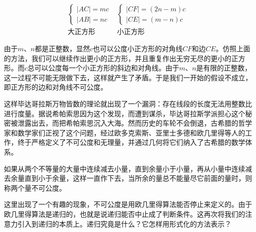 \documentclass[UTF8]{article}
\begin{document}
\[
\begin{array}{c|c}
\begin{cases}
|AC| = mc \\
|AB| = nc
\end{cases} &
\begin{cases}
|CF| = (2n - m)c \\
|CE| = (m - n)c
\end{cases} \\[4ex]
\text{大正方形} & \text{小正方形}
\end{array}
\]

由于$m$、$n$都是正整数，显然$c$也可以公度小正方形的对角线$CF$和边$CE$。仿照上面的方法，我们可以继续作出更小的正方形，并且重复作出无穷无尽的更小的正方形。而$c$总可以公度每一个小正方形的斜边和对角线。由于$m$、$n$是有限的正整数，这一过程不可能无限做下去，这样就产生了矛盾。于是我们一开始的假设不成立，即正方形的边和对角线不可公度。

这样毕达哥拉斯万物皆数的理论就出现了一个漏洞：存在线段的长度无法用整数比进行度量。据说希帕索思因为这个发现，而遭到谋杀，毕达哥拉斯学派担心这个秘密被泄露出去，而把希帕索思沉入大海。然而历史的车轮不会倒退，古希腊的哲学家和数学家们正视了这个问题，经过欧多克索斯、亚里士多德和欧几里得等人的工作，终于严格定义了不可公度和无理量，并通过几何将它们纳入了古希腊的数学体系。

\begin{proposition}
如果从两个不等量的大量中连续减去小量，直到余量小于小量，再从小量中连续减去余量直到小于余量，这样一直作下去，当所余的量总不能量尽它前面的量时，则称两个量不可公度。
\end{proposition}

这里出现了一个有趣的现象，不可公度是用欧几里得算法能否停止来定义的。由于欧几里得算法是递归的，也就是说递归能否中止成了判断条件。这再次将我们的注意力引入到递归的本质上。递归究竟是什么？它怎样用形式化的方法表示？

\begin{Exercise}
\end{Exercise}
\end{document}
